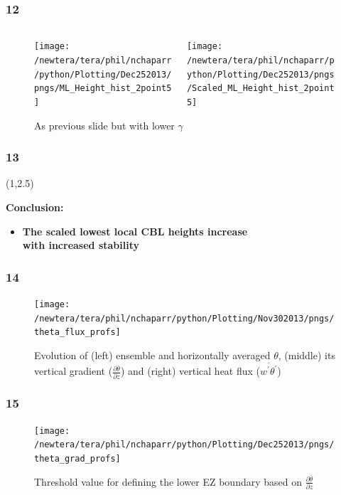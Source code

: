 \documentclass{beamer}
\newcommand\FrameText[1]{
\begin{textblock}{16}(1,2.5)
\raggedright #1
\end{textblock}}
\begin{document}
\begin{frame}
\frametitle{12}
\fontsize{12pt}{7.2}\selectfont
\begin{figure}
\begin{columns}[T]
   \begin{column}{.5\textwidth}
   \texttt{[image: /newtera/tera/phil/nchaparr/python/Plotting/Dec252013/pngs/ML\_Height\_hist\_2point5]} 
   \end{column} 
   
   \begin{column}{.5\textwidth}
    \texttt{[image: /newtera/tera/phil/nchaparr/python/Plotting/Dec252013/pngs/Scaled\_ML\_Height\_hist\_2point5]}
   \end{column}     
\end{columns}
\caption{As previous slide but with lower $\gamma$}
\end{figure}
\end{frame}


\begin{frame}
\frametitle{13}
\FrameText{\bf{\Large Conclusion:}
\vspace{5mm}
\begin{itemize}
\item \bf{\Large The scaled lowest local CBL heights increase\\
with increased stability}
\end{itemize}
}
\end{frame}

\begin{frame}
\frametitle{14}
\fontsize{12pt}{7.2}\selectfont
\begin{figure}
\centering
\texttt{[image: /newtera/tera/phil/nchaparr/python/Plotting/Nov302013/pngs/theta\_flux\_profs]}
\caption{Evolution of (left) ensemble and horizontally averaged $\theta$, (middle) its vertical gradient ($\frac{\partial \overline{\theta}}{\partial z}$) and (right) vertical heat flux ($\overline{w^{'}\theta^{'}}$)}
\end{figure}
\end{frame}

\begin{frame}
\frametitle{15}
\fontsize{12pt}{7.2}\selectfont
\begin{figure}
\centering
\texttt{[image: /newtera/tera/phil/nchaparr/python/Plotting/Dec252013/pngs/theta\_grad\_profs]}
\caption{Threshold value for defining the lower EZ boundary based on $\frac{\partial \overline{\theta}}{\partial z}$}
\end{figure}
\end{frame}
\end{document}
